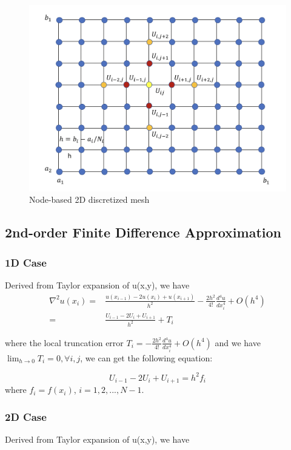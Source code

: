 \documentclass[a4paper]{article}
\begin{document}
\begin{figure}
\includegraphics[width=1\textwidth]{2d.png}
\caption{\label{2d}Node-based 2D discretized mesh}
\end{figure}

\subsection{2nd-order Finite Difference Approximation}
\subsubsection{1D Case}
Derived from Taylor expansion of u(x,y), we have
\begin{equation}
    \begin{split}
    \nabla^2u(x_i) = & \frac{u(x_{i-1}) - 2u(x_i) + u(x_{i+1})}{h^2} -\frac{2h^2}{4!}\frac{d^4 u}{d x_i^4} + O(h^4)\\ 
    = & \frac{U_{i-1} - 2U_{i} + U_{i+1} }{h^2} + T_{i}
    \end{split}
\end{equation}

where the local truncation error $T_{i} = -\frac{2h^2}{4!}\frac{d^4 u}{d x_i^4} + O(h^4)$ and we have $\lim_{h\rightarrow 0} T_{i} = 0, \forall i,j$, we can get the following equation:

\begin{equation}
    U_{i-1} - 2U_{i} + U_{i+1}   = h^2 f_{i}
\end{equation}
where $f_i = f(x_i)$,  $i = 1,2,...,N-1$.

\subsubsection{2D Case}
Derived from Taylor expansion of u(x,y), we have
\end{document}
